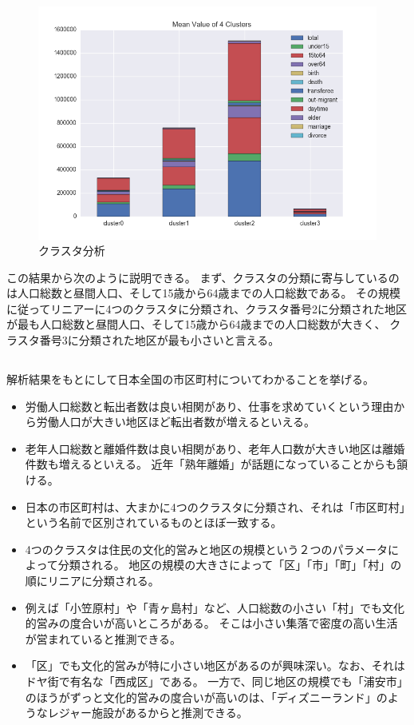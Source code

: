 \documentclass[a4paper,xelatex,ja=standard,jafont=hiragino-pron, 10pt]{bxjsarticle}
\begin{document}
\begin{figure}[ht]
  \centering
  \includegraphics[clip, width=15cm]{../data/picture/clustering.png}
  \caption{クラスタ分析}
  \label{clustering}
\end{figure}

この結果から次のように説明できる。
まず、クラスタの分類に寄与しているのは人口総数と昼間人口、そして15歳から64歳までの人口総数である。
その規模に従ってリニアーに4つのクラスタに分類され、クラスタ番号2に分類された地区が最も人口総数と昼間人口、そして15歳から64歳までの人口総数が大きく、
クラスタ番号3に分類された地区が最も小さいと言える。

\subsection{}

解析結果をもとにして日本全国の市区町村についてわかることを挙げる。

\begin{itemize}
  \item
    労働人口総数と転出者数は良い相関があり、仕事を求めていくという理由から労働人口が大きい地区ほど転出者数が増えるといえる。
  \item
    老年人口総数と離婚件数は良い相関があり、老年人口数が大きい地区は離婚件数も増えるといえる。
    近年「熟年離婚」が話題になっていることからも頷ける。
  \item
    日本の市区町村は、大まかに4つのクラスタに分類され、それは「市区町村」という名前で区別されているものとほぼ一致する。
  \item
    4つのクラスタは住民の文化的営みと地区の規模という２つのパラメータによって分類される。
    地区の規模の大きさによって「区」「市」「町」「村」の順にリニアに分類される。
  \item
    例えば「小笠原村」や「青ヶ島村」など、人口総数の小さい「村」でも文化的営みの度合いが高いところがある。
    そこは小さい集落で密度の高い生活が営まれていると推測できる。
  \item
    「区」でも文化的営みが特に小さい地区があるのが興味深い。なお、それはドヤ街で有名な「西成区」である。
    一方で、同じ地区の規模でも「浦安市」のほうがずっと文化的営みの度合いが高いのは、「ディズニーランド」のようなレジャー施設があるからと推測できる。
\end{itemize}
\end{document}
